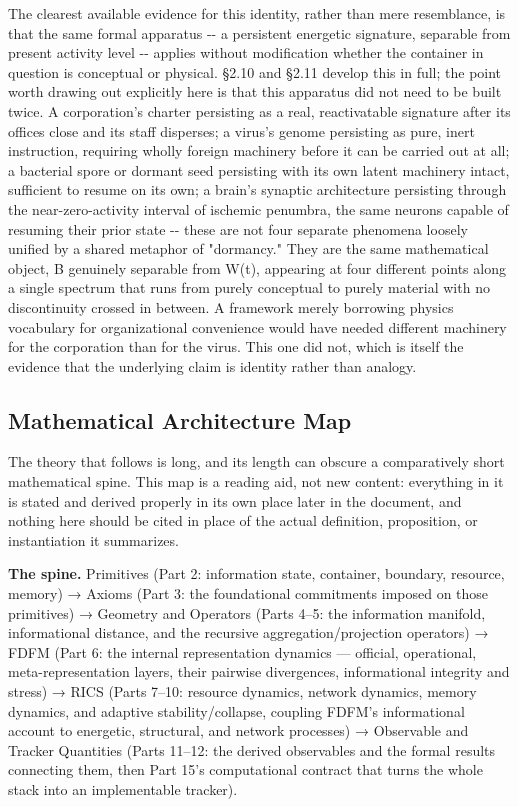 \documentclass[
]{article}
\begin{document}
The clearest available evidence for this identity, rather than mere
resemblance, is that the same formal apparatus -\/- a persistent
energetic signature, separable from present activity level -\/- applies
without modification whether the container in question is conceptual or
physical. §2.10 and §2.11 develop this in full; the point worth drawing
out explicitly here is that this apparatus did not need to be built
twice. A corporation's charter persisting as a real, reactivatable
signature after its offices close and its staff disperses; a virus's
genome persisting as pure, inert instruction, requiring wholly foreign
machinery before it can be carried out at all; a bacterial spore or
dormant seed persisting with its own latent machinery intact, sufficient
to resume on its own; a brain's synaptic architecture persisting through
the near-zero-activity interval of ischemic penumbra, the same neurons
capable of resuming their prior state -\/- these are not four separate
phenomena loosely unified by a shared metaphor of "dormancy." They are
the same mathematical object, B genuinely separable from W(t), appearing
at four different points along a single spectrum that runs from purely
conceptual to purely material with no discontinuity crossed in between.
A framework merely borrowing physics vocabulary for organizational
convenience would have needed different machinery for the corporation
than for the virus. This one did not, which is itself the evidence that
the underlying claim is identity rather than analogy.

\hypertarget{mathematical-architecture-map}{%
\subsection{Mathematical Architecture
Map}\label{mathematical-architecture-map}}

The theory that follows is long, and its length can obscure a
comparatively short mathematical spine. This map is a reading aid, not
new content: everything in it is stated and derived properly in its own
place later in the document, and nothing here should be cited in place
of the actual definition, proposition, or instantiation it summarizes.

\textbf{The spine.} Primitives (Part 2: information state, container,
boundary, resource, memory) → Axioms (Part 3: the foundational
commitments imposed on those primitives) → Geometry and Operators (Parts
4--5: the information manifold, informational distance, and the
recursive aggregation/projection operators) → FDFM (Part 6: the internal
representation dynamics --- official, operational, meta-representation
layers, their pairwise divergences, informational integrity and stress)
→ RICS (Parts 7--10: resource dynamics, network dynamics, memory
dynamics, and adaptive stability/collapse, coupling FDFM's informational
account to energetic, structural, and network processes) → Observable
and Tracker Quantities (Parts 11--12: the derived observables and the
formal results connecting them, then Part 15's computational contract
that turns the whole stack into an implementable tracker).
\end{document}
